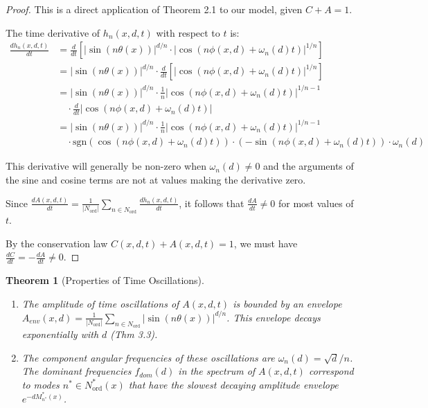 \documentclass[11pt,a4paper]{article}
\newtheorem{theorem}{Theorem}[section]
\begin{document}
\begin{proof}
This is a direct application of Theorem 2.1 to our model, given $C+A=1$.

The time derivative of $h_n(x,d,t)$ with respect to $t$ is:
\begin{align}
\frac{dh_n(x,d,t)}{dt} &= \frac{d}{dt}\left[|\sin(n\theta(x))|^{d/n} \cdot |\cos(n\phi(x,d) + \omega_n(d)t)|^{1/n}\right] \\
&= |\sin(n\theta(x))|^{d/n} \cdot \frac{d}{dt}\left[|\cos(n\phi(x,d) + \omega_n(d)t)|^{1/n}\right] \\
&= |\sin(n\theta(x))|^{d/n} \cdot \frac{1}{n}|\cos(n\phi(x,d) + \omega_n(d)t)|^{1/n-1} \\
&\quad \cdot \frac{d}{dt}|\cos(n\phi(x,d) + \omega_n(d)t)| \\
&= |\sin(n\theta(x))|^{d/n} \cdot \frac{1}{n}|\cos(n\phi(x,d) + \omega_n(d)t)|^{1/n-1} \\
&\quad \cdot \text{sgn}(\cos(n\phi(x,d) + \omega_n(d)t)) \cdot (-\sin(n\phi(x,d) + \omega_n(d)t)) \cdot \omega_n(d)
\end{align}

This derivative will generally be non-zero when $\omega_n(d) \neq 0$ and the arguments of the sine and cosine terms are not at values making the derivative zero.

Since $\frac{dA(x,d,t)}{dt} = \frac{1}{|N_{\text{ord}}|} \sum_{n \in N_{\text{ord}}} \frac{dh_n(x,d,t)}{dt}$, it follows that $\frac{dA}{dt} \neq 0$ for most values of $t$.

By the conservation law $C(x,d,t) + A(x,d,t) = 1$, we must have $\frac{dC}{dt} = -\frac{dA}{dt} \neq 0$.
\end{proof}

\begin{theorem}[Properties of Time Oscillations]
\begin{enumerate}[label=(\alph*)]
\item The amplitude of time oscillations of $A(x,d,t)$ is bounded by an envelope $A_{env}(x,d) = \frac{1}{|N_{\text{ord}}|} \sum_{n \in N_{\text{ord}}} |\sin(n\theta(x))|^{d/n}$. This envelope decays exponentially with $d$ (Thm 3.3).
\item The component angular frequencies of these oscillations are $\omega_n(d) = \sqrt{d}/n$. The dominant frequencies $f_{dom}(d)$ in the spectrum of $A(x,d,t)$ correspond to modes $n^* \in N_{\text{ord}}^*(x)$ that have the slowest decaying amplitude envelope $e^{-dM_{n^*}^*(x)}$.
\end{enumerate}
\end{theorem}
\end{document}

